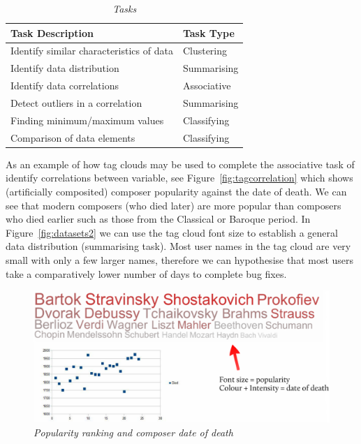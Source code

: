 \begin{table}
\centering
\caption{\textit{Tasks}}
\begin{tabular}{|p{8cm}|p{3cm}|} \hline
 \textbf{Task Description} & \textbf{Task Type} \\ \hline
Identify similar characteristics of data & Clustering \\
Identify data distribution & Summarising \\
Identify data correlations & Associative \\
Detect outliers in a correlation & Summarising \\
Finding minimum/maximum values & Classifying \\
Comparison of data elements  & Classifying\\\hline
\end{tabular}
\label{tab:taskset}
\end{table}

As an example of how tag clouds may be used to complete the associative task of identify correlations between variable, see Figure~\vref{fig:tagcorrelation} which shows (artificially composited) composer popularity against the date of death. We can see that modern composers (who died later) are more popular than composers who died earlier such as those from the Classical or Baroque period. In Figure~\vref{fig:datasets2} we can use the tag cloud font size to establish a general data distribution (summarising task). Most user names in the tag cloud are very small with only a few larger names, therefore we can hypothesise that most users take a comparatively lower number of days to complete bug fixes.

\begin{figure}[!htb]
	\centering
	\includegraphics[scale=0.45]{correlation.png}
	\caption{\emph{Popularity ranking and composer date of death}}
	\label{fig:tagcorrelation}
\end{figure}

